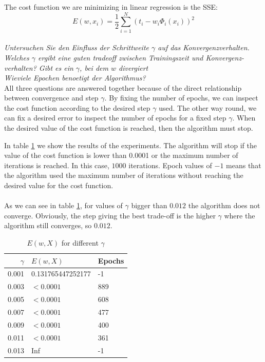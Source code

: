 \documentclass[12pt]{article}
\begin{document}
The cost function we are minimizing in linear regression is the SSE:
\begin{equation}E(w, x_i) = \frac{1}{2}\sum_{i=1}^N(t_i - w_i\Phi_i(x_i))^2\end{equation} \\
\textit{Untersuchen Sie den Einfluss der Schrittweite $\gamma$ auf das Konvergenzverhalten.}\\
\textit{ Welches $\gamma$ ergibt eine guten tradeoff zwischen Trainingszeit und Konvergenz- 
verhalten? Gibt es ein  $\gamma$, bei dem $w$ divergiert}\\
\textit{Wieviele Epochen benoetigt der Algorithmus?}\\

All three questions are answered together because of the direct relationship between convergence and step $\gamma$. By fixing the number of epochs,
we can inspect the cost function according to the desired step $\gamma$ used. The other way round, we can fix a desired
error to inspect the number of epochs for a fixed step $\gamma$. When the desired value of the cost function is reached, then the algorithm must stop. 

In table \ref{table:gammaSSE} we show the results of the experiments. The algorithm will stop if the value of the cost function is lower than 0.0001 or the maximum
number of iterations is reached. In this case, $1000$ iterations. Epoch values of $-1$ means that the algorithm used the maximum number of iterations without reaching the desired value for the cost function.\\\\

As we can see in table \ref{table:gammaSSE}, for values of $\gamma$ bigger than $0.012$ the algorithm does not converge. Obviously, the step giving the best trade-off is the higher $\gamma$ where the algorithm still converges, so $0.012$.
      
\begin{table}
\centering
\begin{tabular}{rll} 
  \hline
  $\gamma$ & $E(w,X)$ & Epochs \\
  \hline \hline
  0.001 & 0.131765447252177 & -1 \\
  \hline
  0.003 & $<0.0001$ & 889 \\
  \hline
  0.005 & $<0.0001$ & 608 \\
  \hline
  0.007 & $<0.0001$ & 477 \\
  \hline
  0.009 & $<0.0001$ & 400 \\
  \hline
  0.011 & $<0.0001$ & 361 \\
  \hline
   0.013 & Inf & -1 \\
  \hline
\end{tabular}
\label{table:gammaSSE}
\caption{$E(w,X)$ for different $\gamma$}
\end{table}
\end{document}
